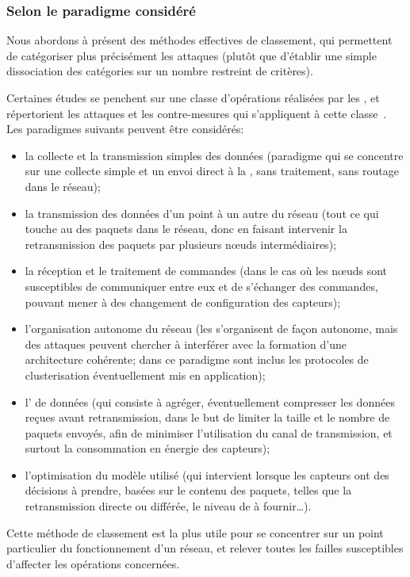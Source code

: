     \subsubsection{Selon le paradigme considéré}\label{ea:sss:paradigm}
Nous abordons à présent des méthodes effectives de classement, qui permettent de catégoriser plus précisément les attaques (plutôt que d'établir une simple dissociation des catégories sur un nombre restreint de critères).

Certaines études se penchent sur une classe d'opérations réalisées par les \rcs, et répertorient les attaques et les contre-mesures qui s'appliquent à cette classe~\cite{JPD06,OX09}.
Les paradigmes suivants peuvent être considérés:
\begin{itemize}
    \item la collecte et la transmission simples des données (paradigme qui se concentre sur une collecte simple et un envoi direct à la \sdb, sans traitement, sans routage dans le réseau);
    \item la transmission des données d'un point à un autre du réseau (\cad tout ce qui touche au  des paquets dans le réseau, donc en faisant intervenir la retransmission des paquets par plusieurs nœuds intermédiaires);
    \item la réception et le traitement de commandes (dans le cas où les nœuds sont susceptibles de communiquer entre eux et de s'échanger des commandes, pouvant mener à des changement de configuration des capteurs);
    \item l'organisation autonome du réseau (les \rcs s'organisent de façon autonome, mais des attaques peuvent chercher à interférer avec la formation d'une architecture cohérente; dans ce paradigme sont inclus les protocoles de clusterisation éventuellement mis en application);
    \item l' de données (qui consiste à agréger, éventuellement compresser les données reçues avant retransmission, dans le but de limiter la taille et le nombre de paquets envoyés, afin de minimiser l'utilisation du canal de transmission, et surtout la consommation en énergie des capteurs);
    \item l'optimisation du modèle utilisé (qui intervient lorsque les capteurs ont des décisions à prendre, basées sur le contenu des paquets, telles que la retransmission directe ou différée, le niveau de \secu à fournir\dots).
\end{itemize}

Cette méthode de classement est la plus utile pour se concentrer sur un point particulier du fonctionnement d'un réseau, et relever toutes les failles susceptibles d'affecter les opérations concernées.

